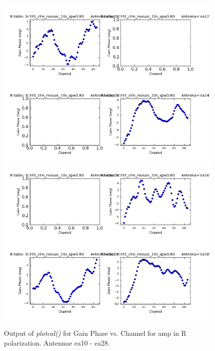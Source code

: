 \documentclass[12pt, a4paper]{article}
\begin{document}
\begin{figure}[h!]
\centering
\includegraphics[scale=0.65]{../Imaging/plots2/part4-subE-question3b_phase_pol-R-ea10-ea14.png}
\includegraphics[scale=0.65]{../Imaging/plots2/part4-subE-question3b_phase_pol-R-ea15-ea18.png}
\caption{Output of \emph{plotcal()} for Gain Phase vs. Channel for amp in R polarization. Antennae ea10 - ea28.}
\end{figure}
\addtocounter{figure}{-1}
\end{document}
